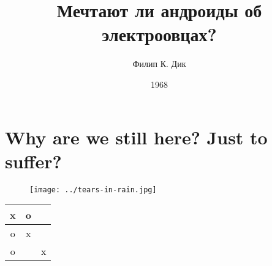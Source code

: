 \documentclass[a4paper,12pt]{article}
\title{Мечтают ли андроиды об электроовцах?}
\author{Филип К. Дик}
\date{1968}
\begin{document}
\maketitle %

\section*{Why are we still here? Just to suffer?} %

\begin{figure}[h] %
  \centering
  \texttt{[image: ../tears-in-rain.jpg]}
\end{figure}

\begin{table}[h] %
  \centering
  \begin{tabular}{|c|c|c|}
  \hline
  x & o &  \\ \hline
  o & x &  \\ \hline
  o &  & x \\ \hline
  \end{tabular}
\end{table}
\end{document}

